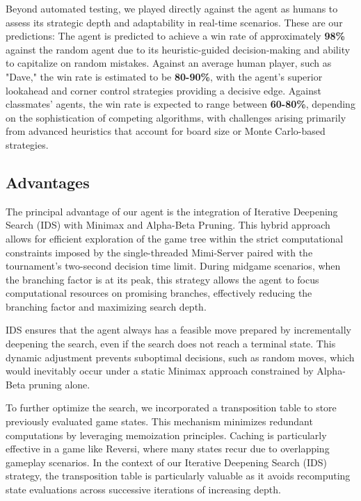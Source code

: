 \documentclass[11pt]{article}
\begin{document}
\noindent Beyond automated testing, we played directly against the agent as humans to assess its strategic depth and adaptability in real-time scenarios.
These are our predictions:
The agent is predicted to achieve a win rate of approximately \textbf{98\%} against the random agent due to its heuristic-guided decision-making and ability to capitalize on random mistakes. Against an average human player, such as "Dave," the win rate is estimated to be \textbf{80-90\%}, with the agent’s superior lookahead and corner control strategies providing a decisive edge. Against classmates' agents, the win rate is expected to range between \textbf{60-80\%}, depending on the sophistication of competing algorithms, with challenges arising primarily from advanced heuristics that account for board size or Monte Carlo-based strategies.


\subsection*{Advantages}
The principal advantage of our agent is the integration of Iterative Deepening Search (IDS) with Minimax and Alpha-Beta Pruning. This hybrid approach allows for efficient exploration of the game tree within the strict computational constraints imposed by the single-threaded Mimi-Server paired with the tournament’s two-second decision time limit. During midgame scenarios, when the branching factor is at its peak, this strategy allows the agent to focus computational resources on promising branches, effectively reducing the branching factor and maximizing search depth.

IDS ensures that the agent always has a feasible move prepared by incrementally deepening the search, even if the search does not reach a terminal state. This dynamic adjustment prevents suboptimal decisions, such as random moves, which would inevitably occur under a static Minimax approach constrained by Alpha-Beta pruning alone.

To further optimize the search, we incorporated a transposition table to store previously evaluated game states. This mechanism minimizes redundant computations by leveraging memoization principles. Caching is particularly effective in a game like Reversi, where many states recur due to overlapping gameplay scenarios. In the context of our Iterative Deepening Search (IDS) strategy, the transposition table is particularly valuable as it avoids recomputing state evaluations across successive iterations of increasing depth.
\end{document}
